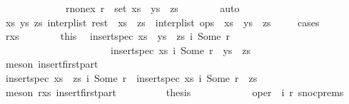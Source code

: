 \begin{isabellebody}
\ \ \ \ \ \ \ \ \ \ \ \ \ {\isacharparenleft}r{\isacharunderscore}nonex{\isacharparenright}\ {\isachardoublequoteopen}r\ {\isasymnotin}\ set\ {\isacharparenleft}xs\ {\isacharat}\ ys\ {\isacharat}\ zs{\isacharparenright}{\isachardoublequoteclose}\isanewline
\ \ \ \ \ \ \isamarkupfalse%
\ auto\isanewline
\ \ \ \ \isamarkupfalse%
\ \isamarkupfalse%
\ {\isachardoublequoteopen}{\isasymexists}xs\ ys\ zs{\isachardot}\ interp{\isacharunderscore}list\ rest\ {\isacharequal}\ xs\ {\isacharat}\ zs\ {\isasymand}\ interp{\isacharunderscore}list\ ops\ {\isacharequal}\ xs\ {\isacharat}\ ys\ {\isacharat}\ zs{\isachardoublequoteclose}\isanewline
\ \ \ \ \isamarkupfalse%
{\isacharparenleft}cases{\isacharparenright}\isanewline
\ \ \ \ \ \ \isamarkupfalse%
\ r{\isacharunderscore}xs\isanewline
\ \ \ \ \ \ \isamarkupfalse%
\ this\ \isamarkupfalse%
\ {\isachardoublequoteopen}insert{\isacharunderscore}spec\ {\isacharparenleft}xs\ {\isacharat}\ ys\ {\isacharat}\ zs{\isacharparenright}\ {\isacharparenleft}i{}{\isacharcomma}\ Some\ r{\isacharparenright}\ {\isacharequal}\isanewline
\ \ \ \ \ \ \ \ \ \ \ \ \ \ \ \ \ \ \ \ \ \ {\isacharparenleft}insert{\isacharunderscore}spec\ xs\ {\isacharparenleft}i{}{\isacharcomma}\ Some\ r{\isacharparenright}{\isacharparenright}\ {\isacharat}\ ys\ {\isacharat}\ zs{\isachardoublequoteclose}\isanewline
\ \ \ \ \ \ \ \ \isamarkupfalse%
\ {\isacharparenleft}meson\ insert{\isacharunderscore}first{\isacharunderscore}part{\isacharparenright}\isanewline
\ \ \ \ \ \ \isamarkupfalse%
\ \isamarkupfalse%
\ {\isachardoublequoteopen}insert{\isacharunderscore}spec\ {\isacharparenleft}xs\ {\isacharat}\ zs{\isacharparenright}\ {\isacharparenleft}i{}{\isacharcomma}\ Some\ r{\isacharparenright}\ {\isacharequal}\ {\isacharparenleft}insert{\isacharunderscore}spec\ xs\ {\isacharparenleft}i{}{\isacharcomma}\ Some\ r{\isacharparenright}{\isacharparenright}\ {\isacharat}\ zs{\isachardoublequoteclose}\isanewline
\ \ \ \ \ \ \ \ \isamarkupfalse%
\ {\isacharparenleft}meson\ r{\isacharunderscore}xs\ insert{\isacharunderscore}first{\isacharunderscore}part{\isacharparenright}\isanewline
\ \ \ \ \ \ \isamarkupfalse%
\ \isamarkupfalse%
\ {\isacharquery}thesis\isanewline
\ \ \ \ \ \ \ \ \isamarkupfalse%
\ {}\ {}\ {\isacartoucheopen}oper\ {\isacharequal}\ {\isacharparenleft}i{}{\isacharcomma}\ r{}{\isacharparenright}{\isacartoucheclose}\ snoc{\isachardot}prems\ \isamarkupfalse%

\end{isabellebody}
